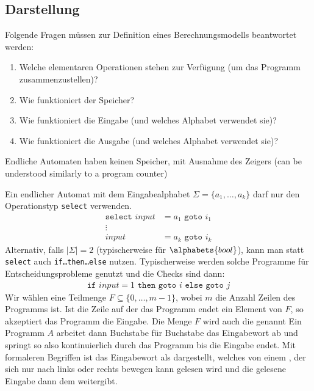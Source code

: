 \subsection{Darstellung}
Folgende Fragen müssen zur Definition eines Berechnungsmodells beantwortet werden:
\begin{enumerate}
    \item Welche elementaren Operationen stehen zur Verfügung (um das Programm zusammenzustellen)?
    \item Wie funktioniert der Speicher?
    \item Wie funktioniert die Eingabe (und welches Alphabet verwendet sie)?
    \item Wie funktioniert die Ausgabe (und welches Alphabet verwendet sie)?
\end{enumerate}
Endliche Automaten haben keinen Speicher, mit Ausnahme des Zeigers (can be understood similarly to a program counter)

Ein endlicher Automat mit dem Eingabealphabet $\Sigma = \{ a_1, \ldots, a_k \}$ darf nur den Operationstyp \texttt{select} verwenden.
\begin{align*}
    \texttt{select } input & = a_1 \texttt{ goto } i_1 \\[-0.2cm]
    \vdots                                             \\
    input                  & = a_k \texttt{ goto } i_k
\end{align*}
Alternativ, falls $|\Sigma| = 2$ (typischerweise für $\alphabets{bool}$), kann man statt \texttt{select} auch \texttt{if\dots then\dots else} nutzen.
Typischerweise werden solche Programme für Entscheidungsprobleme genutzt und die Checks sind dann:
\begin{align*}
    \texttt{if } input = 1 \texttt{ then goto } i \texttt{ else goto } j
\end{align*}
Wir wählen eine Teilmenge $F \subseteq \{ 0, \ldots, m - 1 \}$, wobei $m$ die Anzahl Zeilen des Programms ist.
Ist die Zeile auf der das Programm endet ein Element von $F$, so akzeptiert das Programm die Eingabe.
Die Menge $F$ wird auch die  genannt
%
Ein Programm $A$ arbeitet dann Buchstabe für Buchstabe das Eingabewort ab und springt so also kontinuierlich durch das Programm bis die Eingabe endet.
Mit formaleren Begriffen ist das Eingabewort als  dargestellt, welches von einem , der sich nur nach links oder rechts bewegen kann gelesen wird und die gelesene Eingabe dann dem  weitergibt.

